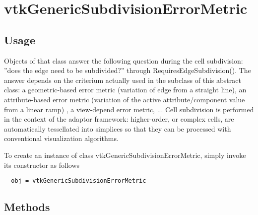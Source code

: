 \section{vtkGenericSubdivisionErrorMetric}

\subsection{Usage}

 Objects of that class answer the following question during the cell
 subdivision: ''does the edge need to be subdivided?'' through
 RequiresEdgeSubdivision(). 
 The answer depends on the criterium actually used in the subclass of this
 abstract class: a geometric-based error
 metric (variation of edge from a straight line), an attribute-based error
 metric (variation of the active attribute/component value from a linear
 ramp) , a view-depend error metric, ...
 Cell subdivision is performed in the context of the adaptor
 framework: higher-order, or complex cells, are automatically tessellated
 into simplices so that they can be processed with conventional
 visualization algorithms.

To create an instance of class vtkGenericSubdivisionErrorMetric, simply
invoke its constructor as follows
\begin{verbatim}
  obj = vtkGenericSubdivisionErrorMetric
\end{verbatim}
\subsection{Methods}

